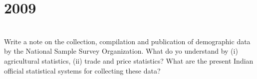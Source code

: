 \section*{2009}
\vspace{-.5cm}
\hrulefill \smallskip\\
 Write a note on the collection, compilation and publication of demographic data by the National Sample Survey Organization. 
\myline
{} What do yo understand by (i) agricultural statistics, (ii) trade and price statistics? What are the present Indian official statistical systems for collecting these data?